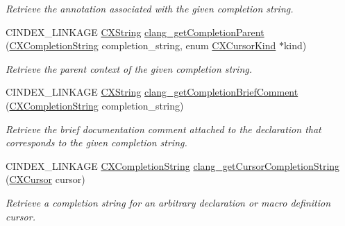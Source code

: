 \begin{DoxyCompactItemize}
\begin{DoxyCompactList}\small\item\em Retrieve the annotation associated with the given completion string. \end{DoxyCompactList}\item 
C\+I\+N\+D\+E\+X\+\_\+\+L\+I\+N\+K\+A\+GE \mbox{\hyperlink{structCXString}{C\+X\+String}} \mbox{\hyperlink{group__CINDEX__CODE__COMPLET_ga8afa885ca6547c96baa1369179b3b236}{clang\+\_\+get\+Completion\+Parent}} (\mbox{\hyperlink{group__CINDEX__CODE__COMPLET_gafea23a43a60ec3b4f3bedccfbb76883a}{C\+X\+Completion\+String}} completion\+\_\+string, enum \mbox{\hyperlink{group__CINDEX_gaaccc432245b4cd9f2d470913f9ef0013}{C\+X\+Cursor\+Kind}} $\ast$kind)
\begin{DoxyCompactList}\small\item\em Retrieve the parent context of the given completion string. \end{DoxyCompactList}\item 
\mbox{\label{group__CINDEX__CODE__COMPLET_ga32163145c7f0013e5f2ac7176a8ee0ed}} 
C\+I\+N\+D\+E\+X\+\_\+\+L\+I\+N\+K\+A\+GE \mbox{\hyperlink{structCXString}{C\+X\+String}} \mbox{\hyperlink{group__CINDEX__CODE__COMPLET_ga32163145c7f0013e5f2ac7176a8ee0ed}{clang\+\_\+get\+Completion\+Brief\+Comment}} (\mbox{\hyperlink{group__CINDEX__CODE__COMPLET_gafea23a43a60ec3b4f3bedccfbb76883a}{C\+X\+Completion\+String}} completion\+\_\+string)
\begin{DoxyCompactList}\small\item\em Retrieve the brief documentation comment attached to the declaration that corresponds to the given completion string. \end{DoxyCompactList}\item 
C\+I\+N\+D\+E\+X\+\_\+\+L\+I\+N\+K\+A\+GE \mbox{\hyperlink{group__CINDEX__CODE__COMPLET_gafea23a43a60ec3b4f3bedccfbb76883a}{C\+X\+Completion\+String}} \mbox{\hyperlink{group__CINDEX__CODE__COMPLET_ga403bcb1ebc70f1ec9e19543d76685f43}{clang\+\_\+get\+Cursor\+Completion\+String}} (\mbox{\hyperlink{structCXCursor}{C\+X\+Cursor}} cursor)
\begin{DoxyCompactList}\small\item\em Retrieve a completion string for an arbitrary declaration or macro definition cursor. \end{DoxyCompactList}\item 
\mbox{\label{group__CINDEX__CODE__COMPLET_gadb669685b9ef1f8ca62b2a044b846ac1}} 

\end{DoxyCompactItemize}
